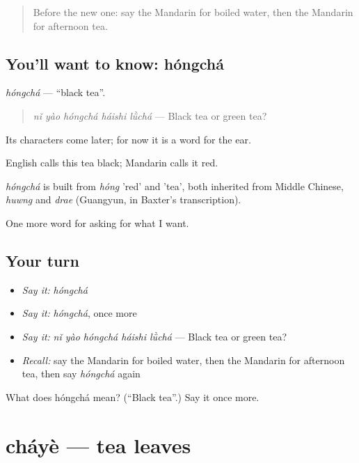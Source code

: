 \begin{quote}
Before the new one: say the Mandarin for boiled water, then the Mandarin for afternoon tea.
\end{quote}

\subsection*{You'll want to know: hóngchá}
\emph{hóngchá} — \textquotedblleft{}black tea\textquotedblright{}.

\begin{quote}
\emph{nǐ yào hóngchá háishi lǜchá} — Black tea or green tea?
\end{quote}

Its characters come later; for now it is a word for the ear.

English calls this tea black; Mandarin calls it red.

\begin{cousinweb}
\emph{hóngchá} is built from \emph{hóng} 'red' and  'tea', both inherited from Middle Chinese, \emph{huwng} and \emph{drae} (Guangyun, in Baxter's transcription).
\end{cousinweb}

\begin{grammarlens}[title={What you've built}]
One more word for asking for what I want.
\end{grammarlens}

\subsection*{Your turn}
\begin{itemize}
\raggedright
  \item \emph{Say it:} \emph{hóngchá}
  \item \emph{Say it:} \emph{hóngchá}, once more
  \item \emph{Say it:} \emph{nǐ yào hóngchá háishi lǜchá} — Black tea or green tea?
  \item \emph{Recall:} say the Mandarin for boiled water, then the Mandarin for afternoon tea, then say \emph{hóngchá} again
\end{itemize}

\begin{tcolorbox}[breakable,colback=teal!4,colframe=teal!35!black,title={Before you move on}]
What does hóngchá mean? (\textquotedblleft{}Black tea\textquotedblright{}.) Say it once more.
\end{tcolorbox}
\section[cháyè]{cháyè — tea leaves}

